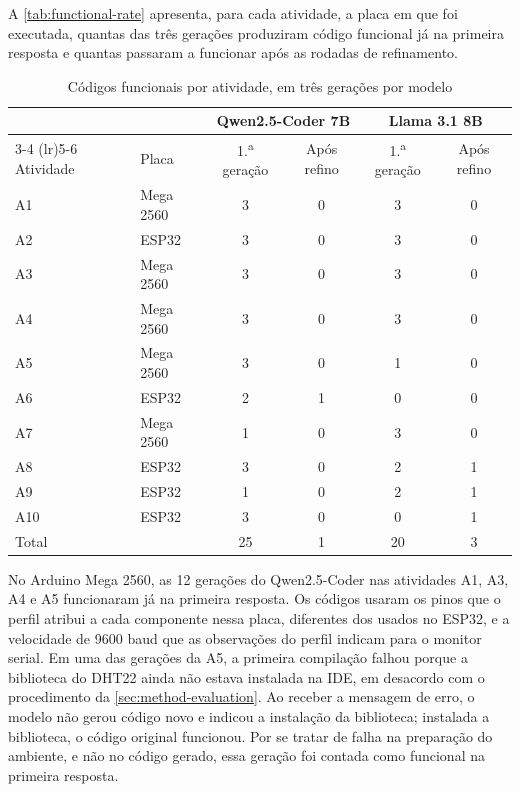 A \autoref{tab:functional-rate} apresenta, para cada atividade, a placa em que foi executada, quantas das três gerações produziram código funcional já na primeira resposta e quantas passaram a funcionar após as rodadas de refinamento.

\begin{table}[!htb]
  \centering
  \caption{Códigos funcionais por atividade, em três gerações por modelo}
  \label{tab:functional-rate}
  \begin{tabular}{llcccc}
    \toprule
    & & \multicolumn{2}{c}{Qwen2.5-Coder 7B} & \multicolumn{2}{c}{Llama 3.1 8B} \\
    \cmidrule(lr){3-4} \cmidrule(lr){5-6}
    Atividade & Placa & 1.\textsuperscript{a} geração & Após refino & 1.\textsuperscript{a} geração & Após refino \\
    \midrule
    A1    & Mega 2560 & 3 & 0 & 3 & 0 \\
    A2    & ESP32     & 3 & 0 & 3 & 0 \\
    A3    & Mega 2560 & 3 & 0 & 3 & 0 \\
    A4    & Mega 2560 & 3 & 0 & 3 & 0 \\
    A5    & Mega 2560 & 3 & 0 & 1 & 0 \\
    A6    & ESP32     & 2 & 1 & 0 & 0 \\
    A7    & Mega 2560 & 1 & 0 & 3 & 0 \\
    A8    & ESP32     & 3 & 0 & 2 & 1 \\
    A9    & ESP32     & 1 & 0 & 2 & 1 \\
    A10   & ESP32     & 3 & 0 & 0 & 1 \\
    \midrule
    Total &           & 25 & 1 & 20 & 3 \\
    \bottomrule
  \end{tabular}
\end{table}

No Arduino Mega 2560, as 12 gerações do Qwen2.5-Coder nas atividades A1, A3, A4 e A5 funcionaram já na primeira resposta. Os códigos usaram os pinos que o perfil atribui a cada componente nessa placa, diferentes dos usados no ESP32, e a velocidade de 9600 baud que as observações do perfil indicam para o monitor serial. Em uma das gerações da A5, a primeira compilação falhou porque a biblioteca do DHT22 ainda não estava instalada na IDE, em desacordo com o procedimento da \autoref{sec:method-evaluation}. Ao receber a mensagem de erro, o modelo não gerou código novo e indicou a instalação da biblioteca; instalada a biblioteca, o código original funcionou. Por se tratar de falha na preparação do ambiente, e não no código gerado, essa geração foi contada como funcional na primeira resposta.

